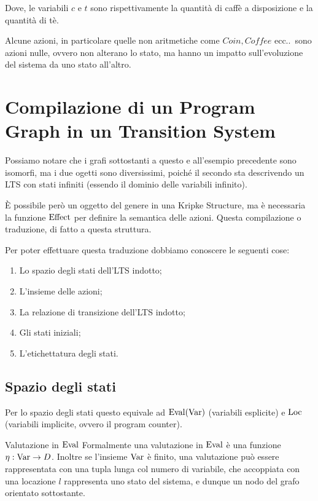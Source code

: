 Dove, le variabili \(c\) e \(t\) sono rispettivamente la quantità di caffè a disposizione e la quantità di tè.

Alcune azioni, in particolare quelle non aritmetiche come \(Coin, Coffee\) ecc..\ sono azioni nulle, ovvero non alterano lo stato, ma hanno un impatto sull'evoluzione del sistema da uno stato all'altro.


\section{Compilazione di un Program Graph in un Transition System}

Possiamo notare che i grafi sottostanti a questo  e all'esempio precedente  sono isomorfi, ma i due ogetti sono diversissimi, poiché il secondo sta descrivendo un LTS con stati infiniti (essendo il dominio delle variabili infinito).

È possibile però  un oggetto del genere in una Kripke Structure, ma è necessaria la funzione \(\operatorname{Effect}\) per definire la semantica delle azioni.
Questa compilazione o traduzione, di fatto  a questa struttura.


Per poter effettuare questa traduzione dobbiamo conoscere le seguenti cose:
\begin{enumerate}
  \item Lo spazio degli stati dell'LTS indotto;
  \item L'insieme delle azioni;
  \item La relazione di transizione dell'LTS indotto;
  \item Gli stati iniziali;
  \item L'etichettatura degli stati.
\end{enumerate}

\subsection{Spazio degli stati}
Per lo spazio degli stati questo equivale ad \(\operatorname{Eval}(\operatorname{Var})\) (variabili esplicite) e \(\operatorname{Loc}\) (variabili implicite, ovvero il program counter).

\begin{definition}{Valutazione in \(\operatorname{Eval}\)}
  Formalmente una valutazione in \(\operatorname{Eval}\) è una funzione \(\eta: \operatorname{Var} \to D\).
  Inoltre se l'insieme \(\operatorname{Var}\) è finito, una valutazione può essere rappresentata con una tupla lunga col numero di variabile, che accoppiata con una locazione \(l\) rappresenta uno stato del sistema, e dunque un nodo del grafo orientato sottostante.
\end{definition}

